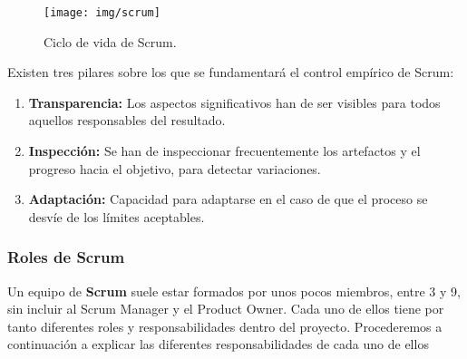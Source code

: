 \begin{figure}[h]
	\centering
	\texttt{[image: img/scrum]}
	\caption{Ciclo de vida de Scrum.}
	\label{fig:scrum}
\end{figure}

\newpage
Existen tres pilares sobre los que se fundamentará el control empírico de Scrum:

\begin{enumerate}
	\item \textbf{Transparencia:} Los aspectos significativos han de ser visibles para todos aquellos responsables del resultado.
	\item \textbf{Inspección:} Se han de inspeccionar frecuentemente los artefactos y el progreso hacia el objetivo, para detectar variaciones.
	\item \textbf{Adaptación:}  Capacidad para adaptarse en el caso de que el proceso se desvíe de los límites aceptables.
\end{enumerate}

\subsubsection{Roles de Scrum}

Un equipo de \textbf{Scrum} suele estar formados por unos pocos miembros, entre 3 y 9, sin incluir al Scrum Manager y el Product Owner. Cada uno de ellos tiene por tanto diferentes roles y responsabilidades dentro del proyecto. Procederemos a continuación a explicar las diferentes responsabilidades de cada uno de ellos

